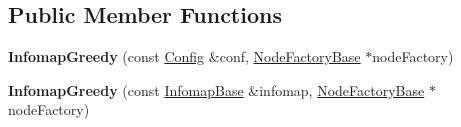 \subsection*{Public Member Functions}
\begin{DoxyCompactItemize}
\item 
\mbox{\label{classInfomapGreedy_a423bc1ffe6544b0b9516eb9edf6941d3}} 
{\bfseries Infomap\+Greedy} (const \mbox{\hyperlink{structConfig}{Config}} \&conf, \mbox{\hyperlink{classNodeFactoryBase}{Node\+Factory\+Base}} $\ast$node\+Factory)
\item 
\mbox{\label{classInfomapGreedy_a7927c5724c0e4f6df05d1fae351ec667}} 
{\bfseries Infomap\+Greedy} (const \mbox{\hyperlink{classInfomapBase}{Infomap\+Base}} \&infomap, \mbox{\hyperlink{classNodeFactoryBase}{Node\+Factory\+Base}} $\ast$node\+Factory)
\end{DoxyCompactItemize}
